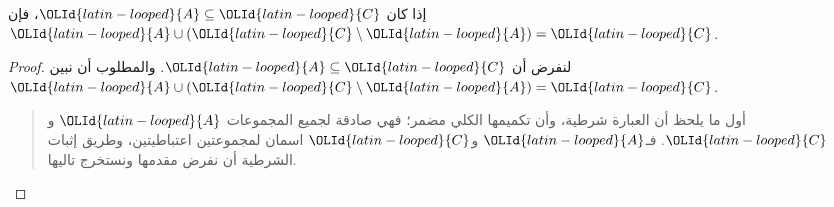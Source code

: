 \documentclass[../../../include/open-logic-section]{subfiles}
\begin{document}


\begin{prop}
إذا كان $\OLId{latin-looped}{A} \subseteq \OLId{latin-looped}{C}$، فإن $\OLId{latin-looped}{A} \cup (\OLId{latin-looped}{C} \setminus \OLId{latin-looped}{A}) = \OLId{latin-looped}{C}$.
\end{prop}

\begin{proof}
  لنفرض أن $\OLId{latin-looped}{A} \subseteq \OLId{latin-looped}{C}$. والمطلوب أن نبين
  $\OLId{latin-looped}{A} \cup (\OLId{latin-looped}{C} \setminus \OLId{latin-looped}{A}) = \OLId{latin-looped}{C}$.
  \begin{quote}
    أول ما يلحظ أن العبارة شرطية، وأن تكميمها الكلي مضمر؛ فهي صادقة
    لجميع المجموعات $\OLId{latin-looped}{A}$ و$\OLId{latin-looped}{C}$. فـ$\OLId{latin-looped}{A}$ و$\OLId{latin-looped}{C}$ اسمان لمجموعتين اعتباطيتين،
    وطريق إثبات الشرطية أن نفرض مقدمها ونستخرج تاليها.


\end{quote}
\end{proof}
\end{document}
